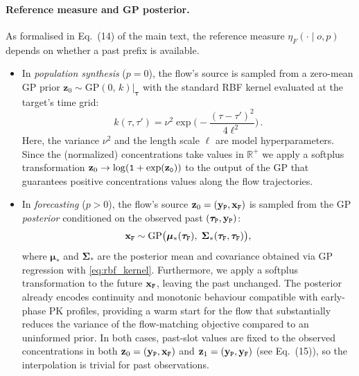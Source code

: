 \paragraph{Reference measure and GP posterior.}
\label{app:ref_measure}
As formalised in Eq.~(14) of the main text, the reference measure
$\eta_F(\cdot \mid o, p)$ depends on whether a past prefix is available.
\begin{itemize}
\item In \emph{population synthesis} ($p = 0$), the flow's source is sampled from a zero-mean GP prior $\mathbf{z}_0 \sim \mathrm{GP}(0,\, k)|_{\boldsymbol{\tau}}$ with the standard RBF kernel evaluated at the target's time grid:
\begin{equation}\label{eq:rbf_kernel}
k(\tau,\tau') = \nu^2 \exp \bigl(-\frac{(\tau-\tau')^2}{4\ell^2}\bigr)\,.
\end{equation}
Here, the variance $\nu^2$ and the length scale $\ell$ are model hyperparameters. Since the (normalized) concentrations take values in $\mathbb{R}^+$ we apply a softplus transformation $\mathbf{z}_0 \to {\tt \log(1+\exp(\mathbf{z}_0 ))}$ to the output of the GP that guarantees positive concentrations values along the flow trajectories. 

\item In \emph{forecasting} ($p > 0$), the flow's source $\mathbf{z}_0 = (\mathbf{y}_{\tt P}, \mathbf{x}_{\tt F})$ is sampled from the GP
\emph{posterior} conditioned on the observed past $(\boldsymbol{\tau}_{\tt P}, \mathbf{y}_{\tt P})$:
\begin{equation}
    \mathbf{x}_{\tt F} \sim \mathrm{GP}\bigl(\bm{\mu}_*(\boldsymbol{\tau}_{\tt F}),\;
    \bm{\Sigma}_*(\boldsymbol{\tau}_{\tt F}, \boldsymbol{\tau}_{\tt F})\bigr),
    \label{eq:gp_post}
\end{equation}
where $\bm{\mu}_*$ and $\bm{\Sigma}_*$ are the posterior mean and covariance obtained via GP regression with \eqref{eq:rbf_kernel}. Furthermore, we apply a softplus transformation to the future $\bf x_{\tt F}$, leaving the past unchanged. The posterior already encodes continuity and monotonic behaviour compatible with early-phase PK profiles, providing a warm start for the flow that
substantially reduces the variance of the flow-matching objective compared to
an uninformed prior.
In both cases, past-slot values are fixed to the observed concentrations in
both $\mathbf{z}_0 = (\mathbf{y}_{\tt P}, \mathbf{x}_{\tt F})$ and $\mathbf{z}_1 = (\mathbf{y}_{\tt P}, \mathbf{y}_{\tt F})$
(see Eq.\ (15)), so the interpolation is trivial for past observations.
\end{itemize}

